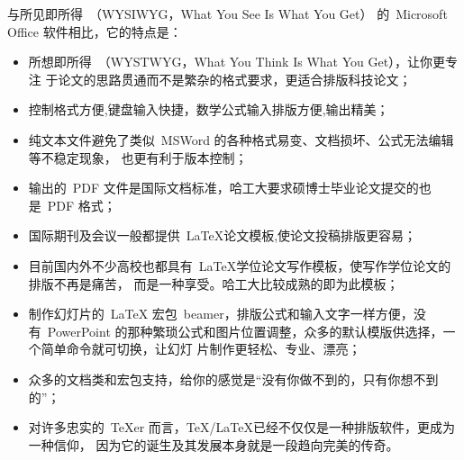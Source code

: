         与所见即所得~（WYSIWYG，What You See Is What You Get） 的~Microsoft Office
软件相比，它的特点是：
   \begin{itemize}
      \item 所想即所得~（WYSTWYG，What You Think Is What You Get），让你更专注
于论文的思路贯通而不是繁杂的格式要求，更适合排版科技论文；
      \item 控制格式方便,键盘输入快捷，数学公式输入排版方便,输出精美；
      \item 纯文本文件避免了类似~MSWord 的各种格式易变、文档损坏、公式无法编辑等不稳定现象，
      也更有利于版本控制；
      \item 输出的~PDF 文件是国际文档标准，哈工大要求硕博士毕业论文提交的也是~PDF 格式；
      \item 国际期刊及会议一般都提供~\LaTeX 论文模板,使论文投稿排版更容易；
      \item 目前国内外不少高校也都具有~\LaTeX{}学位论文写作模板，使写作学位论文的排版不再是痛苦，
      而是一种享受。哈工大比较成熟的即为此模板；
      \item 制作幻灯片的~LaTeX 宏包~beamer，排版公式和输入文字一样方便，没有~PowerPoint
的那种繁琐公式和图片位置调整，众多的默认模版供选择，一个简单命令就可切换，让幻灯
片制作更轻松、专业、漂亮；
      \item  众多的文档类和宏包支持，给你的感觉是``没有你做不到的，只有你想不到的''；
      \item  对许多忠实的~TeXer 而言，\TeX/\LaTeX 已经不仅仅是一种排版软件，更成为一种信仰，
      因为它的诞生及其发展本身就是一段趋向完美的传奇。
    \end{itemize}

